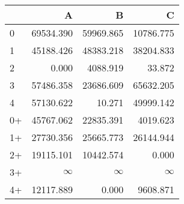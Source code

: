 \begin{tabular}{lrrr}
\toprule
     &         A &         B &         C \\
\midrule
 0   & \num{69534.390} & \num{59969.865} & \num{10786.775} \\
 1   & \num{45188.426} & \num{48383.218} & \num{38204.833} \\
 2   &     \num{0.000} &  \num{4088.919} &    \num{33.872} \\
 3   & \num{57486.358} & \num{23686.609} & \num{65632.205} \\
 4   & \num{57130.622} &    \num{10.271} & \num{49999.142} \\
 0+  & \num{45767.062} & \num{22835.391} &  \num{4019.623} \\
 1+  & \num{27730.356} & \num{25665.773} & \num{26144.944} \\
 2+  & \num{19115.101} & \num{10442.574} &     \num{0.000} \\
 3+  &  $\infty$    &  $\infty$    &  $\infty$    \\
 4+  & \num{12117.889} &     \num{0.000} &  \num{9608.871} \\
\bottomrule
\end{tabular}